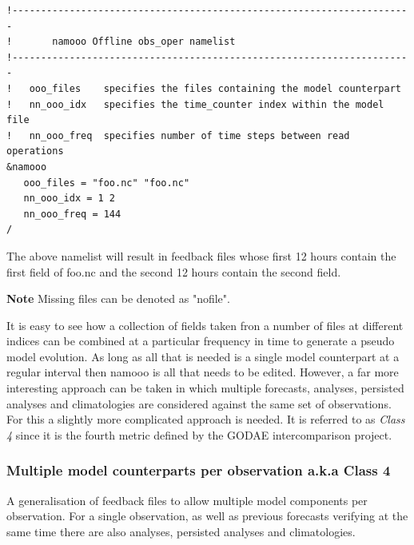 \begin{alltt}
\tiny
\begin{verbatim} 
!----------------------------------------------------------------------
!       namooo Offline obs_oper namelist
!----------------------------------------------------------------------
!   ooo_files    specifies the files containing the model counterpart
!   nn_ooo_idx   specifies the time_counter index within the model file
!   nn_ooo_freq  specifies number of time steps between read operations
&namooo
   ooo_files = "foo.nc" "foo.nc"
   nn_ooo_idx = 1 2
   nn_ooo_freq = 144
/
\end{verbatim} 
\end{alltt}

The above namelist will result in feedback files whose first 12 hours contain
the first field of foo.nc and the second 12 hours contain the second field.

\textbf{Note} Missing files can be denoted as "nofile".

It is easy to see how a collection of fields taken fron a number of files 
at different indices can be combined at a particular frequency in time to 
generate a pseudo model evolution. As long as all that is needed is a single
model counterpart at a regular interval then namooo is all that needs to
be edited. However, a far more interesting approach can be taken in which
multiple forecasts, analyses, persisted analyses and climatologies are
considered against the same set of observations. For this a slightly more
complicated approach is needed. It is referred to as \emph{Class 4} since
it is the fourth metric defined by the GODAE intercomparison project.

\subsubsection{Multiple model counterparts per observation a.k.a Class 4}

A generalisation of feedback files to allow multiple model components per observation. For a single
observation, as well as previous forecasts verifying at the same time there are also analyses, persisted
analyses and climatologies. 


